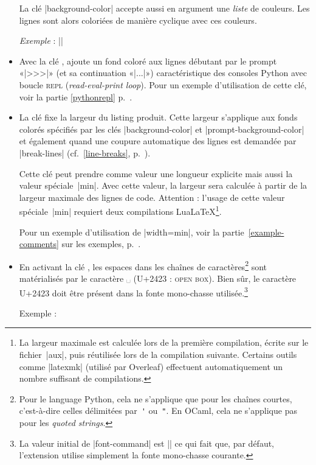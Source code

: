 \documentclass[dvipsnames,svgnames]{article}
\begin{document}
\begin{itemize}
\smallskip
La clé |background-color| accepte aussi en argument une \emph{liste} de couleurs. Les
lignes sont alors coloriées de manière cyclique avec ces couleurs.

\emph{Exemple} : ||


\item {} Avec la clé ,
 ajoute un fond coloré aux lignes débutant par le prompt «|>>>|» (et sa
continuation «|...|») caractéristique des consoles Python avec boucle \textsc{repl}
(\emph{read-eval-print loop}). Pour un exemple d'utilisation de cette clé, voir la partie
\ref{pythonrepl} p.~\pageref{pythonrepl}.

\item {} La clé  fixe la largeur du listing produit. Cette
largeur s'applique aux fonds colorés spécifiés par les clés |background-color| et
|prompt-background-color| et également quand une coupure automatique des lignes est
demandée par |break-lines| (cf.~\ref{line-breaks}, p.~\pageref{line-breaks}).

Cette clé peut prendre comme valeur une longueur explicite mais aussi la valeur
spéciale~|min|. Avec cette valeur, la largeur sera calculée à partir de la largeur
maximale des lignes de code. Attention : l'usage de cette valeur spéciale~|min| requiert
deux compilations LuaLaTeX\footnote{La largeur maximale est calculée lors de la première
  compilation, écrite sur le fichier~|aux|, puis réutilisée lors de la compilation
  suivante. Certains outils comme |latexmk| (utilisé par Overleaf) effectuent
  automatiquement un nombre suffisant de compilations.}.

Pour un exemple d'utilisation de |width=min|, voir la partie~\ref{example-comments} sur
les exemples, p.~\pageref{example-comments}.

\item {} En activant la clé
, les espaces dans les chaînes de
caractères\footnote{Pour le language Python, cela ne s'applique que pour les chaînes
  courtes, c'est-à-dire celles délimitées par~\verb|'| ou~\verb|"|. En OCaml, cela ne
  s'applique pas pour les \emph{quoted strings}.} sont matérialisés par le caractère ␣
(U+2423 : \textsc{open box}). Bien sûr, le caractère U+2423 doit être présent dans la
fonte mono-chasse utilisée.\footnote{La valeur initial de |font-command| est |\ttfamily|
  ce qui fait que, par défaut, l'extension  utilise simplement la fonte
  mono-chasse courante.}\par\nobreak
%
\begingroup
{}
Exemple : 
\endgroup


\end{itemize}
\end{document}
